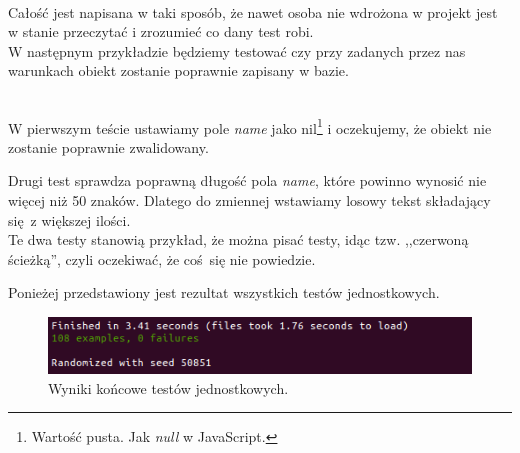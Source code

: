 \begin{code}
	
\end{code}\\

Całość jest napisana w taki sposób, że nawet osoba nie wdrożona w projekt jest w stanie przeczytać i zrozumieć co dany test robi.
\\

W następnym przykładzie będziemy testować czy przy zadanych przez nas warunkach obiekt zostanie poprawnie zapisany w bazie.

\begin{code}
	
\end{code}\\

W pierwszym teście ustawiamy pole \emph{name} jako nil\footnote{Wartość pusta. Jak \emph{null} w JavaScript.} i oczekujemy, że obiekt nie zostanie poprawnie zwalidowany.

Drugi test sprawdza poprawną długość pola \emph{name}, które powinno wynosić nie więcej niż 50 znaków. Dlatego do zmiennej wstawiamy losowy tekst składający się z większej ilości.\\

Te dwa testy stanowią przykład, że można pisać testy, idąc tzw. ,,czerwoną ścieżką'', czyli oczekiwać, że coś się nie powiedzie.

Ponieżej przedstawiony jest rezultat wszystkich testów jednostkowych.

\begin{figure}[h]
  \centering
  \includegraphics[scale=0.8]{images/rspec_result.png}
  \caption{Wyniki końcowe testów jednostkowych.}
\end{figure}
